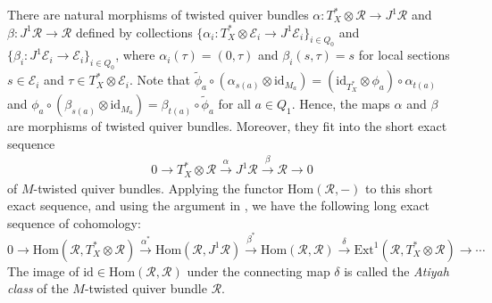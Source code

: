 \documentclass[12pt, reqno]{amsart}
\theoremstyle{plain}
\numberwithin{equation}{section}
\begin{document}
	
	There are natural morphisms of twisted quiver bundles $\alpha: T^*_X \otimes \mathcal{R} \rightarrow J^1\mathcal{R}$ and $\beta: J^1\mathcal{R} \rightarrow \mathcal{R}$ defined by collections $\{\alpha_i: T^*_X \otimes \mathcal{E}_i \rightarrow J^1\mathcal{E}_i \}_{i\in Q_0}$ and $\{\beta_i: J^1\mathcal{E}_i \rightarrow \mathcal{E}_i\}_{i\in Q_0}$, where $\alpha_i(\tau)=(0,\tau)$ and $\beta_i(s,\tau)=s$ for local sections $s\in \mathcal{E}_i$ and $\tau \in T^*_X \otimes \mathcal{E}_i$. Note that $\tilde{\phi}_a \circ \left(\alpha_{s(a)} \otimes \mathrm{id}_{M_a}\right)=\left(\mathrm{id}_{T^*_X}\otimes \phi_{a}\right)\circ \alpha_{t(a)}$ and $\phi_a \circ \left(\beta_{s(a)} \otimes \mathrm{id}_{M_a}\right)=\beta_{t(a)} \circ \tilde{\phi}_a$ for all $a\in Q_1$. Hence, the maps $\alpha$ and $\beta$ are morphisms of twisted quiver bundles. Moreover, they fit into the short exact sequence
	\begin{align}\label{Q-JetSeq}
		0 \longrightarrow T^*_X \otimes \mathcal{R} \overset{\alpha}{\longrightarrow} J^1\mathcal{R} \overset{\beta}{\longrightarrow}  \mathcal{R} \longrightarrow 0  
	\end{align}
	of $M$-twisted quiver bundles. Applying the functor $\mathrm{Hom}(\mathcal{R},-)$ to this short exact sequence, and using the argument in \cite[Theorem 5.1]{GK}, we have the following long exact sequence of cohomology:
	$$0 \longrightarrow \mathrm{Hom}(\mathcal{R}, T^*_X \otimes \mathcal{R}) \overset{\alpha^*}{\longrightarrow} \mathrm{Hom}(\mathcal{R}, J^1\mathcal{R}) \overset{\beta^*}{\longrightarrow} \mathrm{Hom}(\mathcal{R},\mathcal{R}) \overset{\delta}{\longrightarrow} \mathrm{Ext}^1(\mathcal{R}, T^*_X \otimes \mathcal{R}) \longrightarrow \cdots $$
	The image of $\mathrm{id}\in \mathrm{Hom}(\mathcal{R},\mathcal{R})$ under the connecting map $\delta$ is called the \emph{Atiyah class} of the $M$-twisted quiver bundle $\mathcal{R}$.
	
\end{document}

